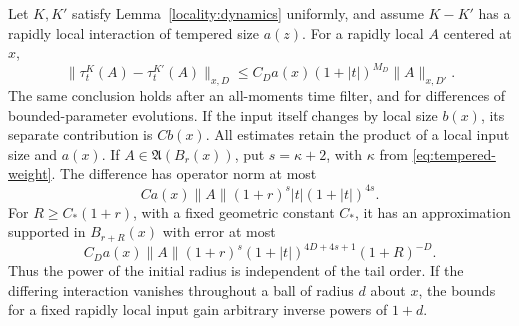 \begin{lemma}\label{locality:difference}
Let $K,K'$ satisfy Lemma~\ref{locality:dynamics} uniformly, and assume
$K-K'$ has a rapidly local interaction of tempered size $a(z)$.
For a rapidly local $A$ centered at $x$,
\begin{equation}
 \|\tau_t^K(A)-\tau_t^{K'}(A)\|_{x,D}
 \leq C_Da(x)(1+|t|)^{M_D}\|A\|_{x,D'}.
 \label{eq:weighted-evolution-difference}
\end{equation}
The same conclusion holds after an all-moments time filter, and for
differences of bounded-parameter evolutions.  If the input itself
changes by local size $b(x)$, its separate contribution is $Cb(x)$.
All estimates retain the product of a local input size and $a(x)$.
If $A\in\mathfrak A(B_r(x))$, put $s=\kappa+2$, with $\kappa$ from
\eqref{eq:tempered-weight}.  The difference has operator norm at most
\begin{equation}
 C a(x)\|A\|(1+r)^s|t|(1+|t|)^{4s}.
 \label{eq:difference-core}
\end{equation}
For $R\geq C_*(1+r)$, with a fixed geometric constant $C_*$, it has
an approximation supported in $B_{r+R}(x)$
with error at most
\begin{equation}
 C_Da(x)\|A\|(1+r)^s
        (1+|t|)^{4D+4s+1}(1+R)^{-D}.
 \label{eq:difference-tail}
\end{equation}
Thus the power of the initial radius is independent of the tail order.
If the differing interaction vanishes throughout a ball of radius $d$
about $x$, the bounds for a fixed rapidly local input gain arbitrary
inverse powers of $1+d$.
\end{lemma}

